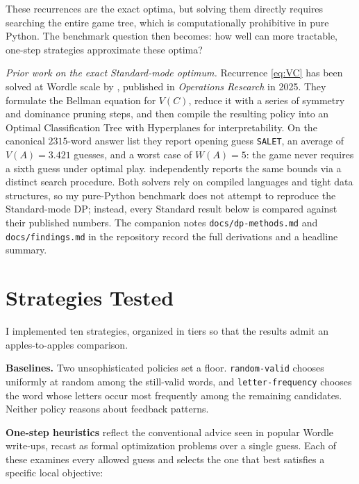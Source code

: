 \documentclass[11pt]{article}
\begin{document}
These recurrences are the exact optima, but solving them directly
requires searching the entire game tree, which is computationally
prohibitive in pure Python. The benchmark question then becomes: how
well can more tractable, one-step strategies approximate these optima?

\textit{Prior work on the exact Standard-mode optimum.} Recurrence
\eqref{eq:VC} has been solved at Wordle scale by
\citet{bertsimas2022wordle}, published in \emph{Operations Research}
in 2025. They formulate the Bellman equation for $V(C)$, reduce it
with a series of symmetry and dominance pruning steps, and then
compile the resulting policy into an Optimal Classification Tree with
Hyperplanes for interpretability. On the canonical $\num{2315}$-word
answer list they report opening guess \texttt{SALET}, an average of
$V(A) = 3.421$ guesses, and a worst case of $W(A) = 5$: the game
never requires a sixth guess under optimal play.
\citet{selby2022wordle} independently reports the same bounds via a
distinct search procedure. Both solvers rely on compiled languages
and tight data structures, so my pure-Python benchmark does not
attempt to reproduce the Standard-mode DP; instead, every Standard
result below is compared against their published numbers. The
companion notes \texttt{docs/dp-methods.md} and
\texttt{docs/findings.md} in the repository record the full
derivations and a headline summary.

\section*{Strategies Tested}

I implemented ten strategies, organized in tiers so that the results
admit an apples-to-apples comparison.

\textbf{Baselines.} Two unsophisticated policies set a floor.
\texttt{random-valid} chooses uniformly at random among the still-valid
words, and \texttt{letter-frequency} chooses the word whose letters
occur most frequently among the remaining candidates. Neither policy
reasons about feedback patterns.

\textbf{One-step heuristics} reflect the conventional advice seen in
popular Wordle write-ups, recast as formal optimization problems over
a single guess. Each of these examines every allowed guess and selects
the one that best satisfies a specific local objective:
\end{document}
